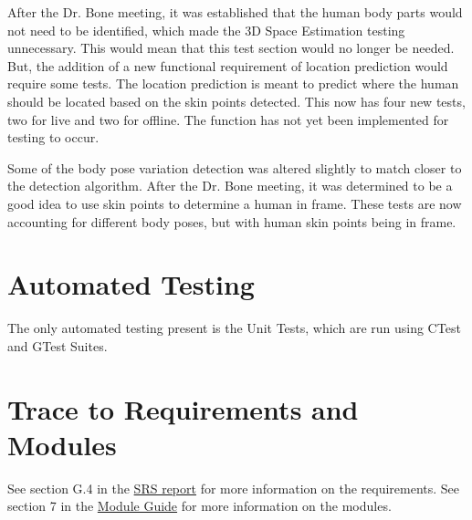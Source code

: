 \documentclass[12pt, titlepage]{article}
\begin{document}
After the Dr. Bone meeting, it was established that the human body parts would not need to be identified, which made the 3D Space Estimation testing unnecessary. This would mean that this test section would no longer be needed. But, the addition of a new functional requirement of location prediction would require some tests. The location prediction is meant to predict where the human should be located based on the skin points detected. This now has four new tests, two for live and two for offline. The function has not yet been implemented for testing to occur.

Some of the body pose variation detection was altered slightly to match closer to the detection algorithm. After the Dr. Bone meeting, it was determined to be a good idea to use skin points to determine a human in frame. These tests are now accounting for different body poses, but with human skin points being in frame.


\section{Automated Testing}

The only automated testing present is the Unit Tests, which are run using CTest and GTest Suites.
		
\section{Trace to Requirements and Modules}		
See section G.4 in the \href{https://github.com/takhtart/PCD/blob/main/docs/SRS/SRS.pdf}{SRS report} for more information on the requirements. See section 7 in the \href{https://github.com/takhtart/PCD/blob/main/docs/Design/SoftArchitecture/MG.pdf}{Module Guide} for more information on the modules.
\end{document}
